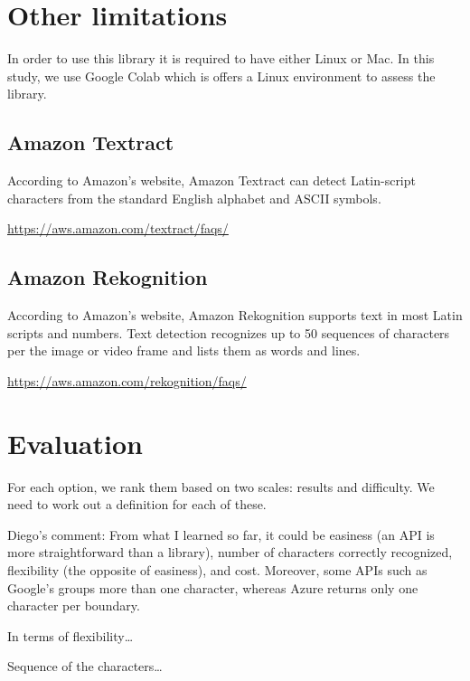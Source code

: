 \documentclass[
]{article}
\begin{document}
\hypertarget{other-limitations}{%
\section{Other limitations}\label{other-limitations}}

In order to use this library it is required to have either Linux or Mac.
In this study, we use Google Colab which is offers a Linux environment
to assess the library.

\hypertarget{amazon-textract}{%
\subsection{Amazon Textract}\label{amazon-textract}}

According to Amazon's website, Amazon Textract can detect Latin-script
characters from the standard English alphabet and ASCII symbols.

\url{https://aws.amazon.com/textract/faqs/}

\hypertarget{amazon-rekognition}{%
\subsection{Amazon Rekognition}\label{amazon-rekognition}}

According to Amazon's website, Amazon Rekognition supports text in most
Latin scripts and numbers. Text detection recognizes up to 50 sequences
of characters per the image or video frame and lists them as words and
lines.

\url{https://aws.amazon.com/rekognition/faqs/}

\hypertarget{evaluation}{%
\section{Evaluation}\label{evaluation}}

For each option, we rank them based on two scales: results and
difficulty. We need to work out a definition for each of these.

Diego's comment: From what I learned so far, it could be easiness (an
API is more straightforward than a library), number of characters
correctly recognized, flexibility (the opposite of easiness), and cost.
Moreover, some APIs such as Google's groups more than one character,
whereas Azure returns only one character per boundary.

In terms of flexibility\ldots{}

Sequence of the characters\ldots{}
\end{document}
